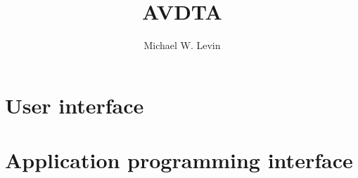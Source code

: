 \documentclass[12pt]{report}
\title{AVDTA}
\author{Michael W. Levin}
\begin{document}
	\setcounter{tocdepth}{3}
	\allowdisplaybreaks
	
	\maketitle
	\newpage
	
	
	
	
	
	\setcounter{page}{2}
	
	
	\newpage
	
	\renewcommand*\contentsname{Table of Contents}
	\tableofcontents
	\newpage
	
	
	
	
	
	
	
	
	
	\part{User interface}
	\label{part:ui}
	
	
	

	
	
	
	
	
	
	
	
	\part{Application programming interface} 
	\label{part:api}
	
	
	
	\begin{appendices}
	
	
	\end{appendices}
	
	
	
	
\end{document}
